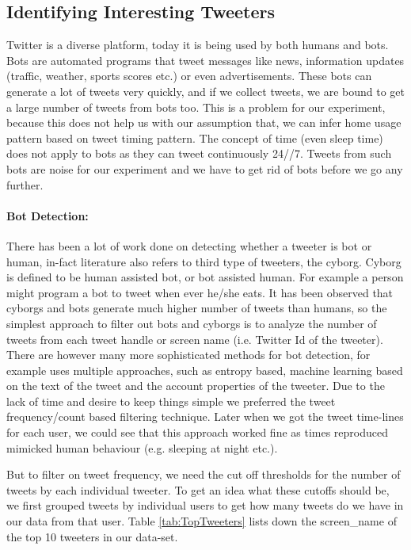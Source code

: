 \documentclass[12pt]{report}
\theoremstyle{named}
\begin{document}
\subsection{Identifying Interesting Tweeters}
Twitter is a diverse platform, today it is being used by both humans and bots. Bots are automated programs that tweet messages like news, information updates (traffic, weather, sports scores etc.) or even advertisements. These bots can generate a lot of tweets very quickly, and if we collect tweets, we are bound to get a large number of tweets from bots too. This is a problem for our experiment, because this does not help us with our assumption that, we can infer home usage pattern based on tweet timing pattern. The concept of time (even sleep time) does not apply to bots as they can tweet continuously 24//7. Tweets from such bots are noise for our experiment and we have to get rid of bots before we go any further.
\paragraph{Bot Detection:\\}
There has been a lot of work done on detecting whether a tweeter is bot or human, in-fact literature also refers to third type of tweeters, the cyborg. Cyborg is defined to be human assisted bot, or bot assisted human. For example a person might program a bot to tweet when ever he/she eats. It has been observed that cyborgs and bots generate much higher number of tweets than humans, so the simplest approach to filter out bots and cyborgs is to analyze the number of tweets from each tweet handle or screen name (i.e. Twitter Id of the tweeter). 
There are however many more sophisticated methods for bot detection, for example \cite{chu2010tweeting} uses multiple approaches, such as entropy based, machine learning based on the text of the tweet and the account properties of the tweeter. Due to the lack of time and desire to keep things simple we preferred the tweet frequency/count based filtering technique. Later when we got the tweet time-lines for each user, we could see that this approach worked fine as times reproduced mimicked human behaviour (e.g. sleeping at night etc.). 

But to filter on tweet frequency, we need the cut off thresholds for the number of tweets by each individual tweeter. To get an idea what these cutoffs should be, we first grouped tweets by individual users to get how many tweets do we have in our data from that user. Table \ref{tab:TopTweeters} lists down the screen\_name of the top 10 tweeters in our data-set.
\end{document}

